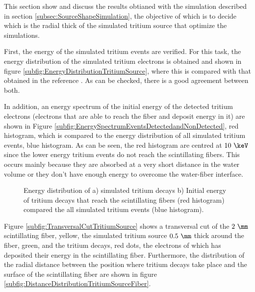 This section show and discuss the results obtianed with the simulation described in section \ref{subsec:SourceShapeSimulation}, the objective of which is to decide which is the radial thick of the simulated tritium source that optimize the simulations. 

First, the energy of the simulated tritium events are verified. For this task, the energy distribution of the simulated tritium electrons is obtained and shown in figure \ref{subfig:EnergyDistributionTritiumSource}, where this is compared with that obtained in the reference \cite{TritiumEmissionSpectrum}. As can be checked, there is a good agreement between both.

In addition, an energy spectrum of the initial energy of the detected tritium electrons (electrons that are able to reach the fiber and deposit energy in it) are shown in Figure \ref{subfig:EnergySpectrumEventsDetectedandNonDetected}, red histogram, which is compared to the energy distribution of all simulated tritium events, blue histogram. As can be seen, the red histogram are centred at $10~\keV$ since the lower energy tritium events do not reach the scintillating fibers. This occurs mainly because they are absorbed at a very short distance in the water volume or they don't have enough energy to overcome the water-fiber interface.

\begin{figure}[h]
 \centering
 \caption{ Energy distribution of a) simulated tritium decays b) Initial energy of tritium decays that reach the scintillating fibers (red histogram) compared the all simulated tritium events (blue histogram).}
 \label{fig:TritiumSourceOptimization}
\end{figure}

Figure \ref{subfig:TransversalCutTritiumSource} shows a transversal cut of the $2~\mm$ scintillating fiber, yellow, the simulated tritium source $0.5~\mm$ thick around the fiber, green, and the tritium decays, red dots, the electrons of which has deposited their energy in the scintillating fiber. Furthermore, the distribution of the radial distance between the position where tritium decays take place and the surface of the scintillating fiber are shown in figure \ref{subfig:DistanceDistributionTritiumSourceFiber}.

